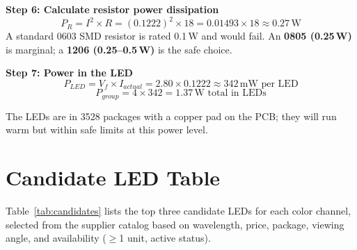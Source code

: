 \documentclass[12pt,letterpaper]{article}
\begin{document}
\textbf{Step 6: Calculate resistor power dissipation}
\[
  P_R = I^2 \times R = (0.1222)^2 \times 18 = 0.01493 \times 18 \approx 0.27\,\text{W}
\]
A standard 0603 SMD resistor is rated 0.1\,W and would fail.
An \textbf{0805 (0.25\,W)} is marginal; a \textbf{1206 (0.25--0.5\,W)} is the safe choice.

\textbf{Step 7: Power in the LED}
\[
  P_{LED} = V_f \times I_{actual} = 2.80 \times 0.1222 \approx 342\,\text{mW per LED}
\]
\[
  P_{group} = 4 \times 342 = 1.37\,\text{W total in LEDs}
\]

The LEDs are in 3528 packages with a copper pad on the PCB; they will run warm but
within safe limits at this power level.

\section{Candidate LED Table}

Table~\ref{tab:candidates} lists the top three candidate LEDs for each color channel,
selected from the supplier catalog based on wavelength, price, package, viewing angle,
and availability ($\geq$1 unit, active status).
\end{document}
